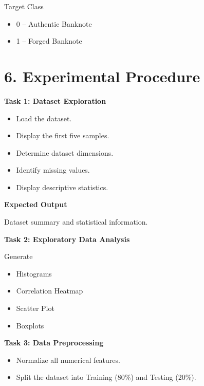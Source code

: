 \documentclass[11pt]{article}
\begin{document}
Target Class

\begin{itemize}
\item 0 -- Authentic Banknote
\item 1 -- Forged Banknote
\end{itemize}


\section*{6. Experimental Procedure}

\textbf{Task 1: Dataset Exploration}

\begin{itemize}
\item Load the dataset.
\item Display the first five samples.
\item Determine dataset dimensions.
\item Identify missing values.
\item Display descriptive statistics.
\end{itemize}

\textbf{Expected Output}

Dataset summary and statistical information.

\vspace{2mm}

\textbf{Task 2: Exploratory Data Analysis}

Generate

\begin{itemize}
\item Histograms
\item Correlation Heatmap
\item Scatter Plot
\item Boxplots
\end{itemize}

\vspace{2mm}

\textbf{Task 3: Data Preprocessing}

\begin{itemize}
\item Normalize all numerical features.
\item Split the dataset into Training (80\%) and Testing (20\%).
\end{itemize}

\vspace{2mm}
\end{document}
